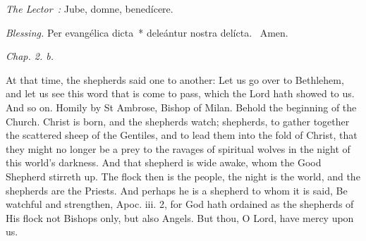 {  {
    \medskip

    \emph{The Lector~:} Jube, domne, benedícere.

    \emph{Blessing.} Per evangélica dicta~* deleántur nostra delícta. \Rbar{}~Amen.
  }

  \bigskip{}
  {


  }

  {
    \hspace{10ex}{Lesson VIII.}\hfill\emph{Chap. 2. b.}\hspace{10ex}

    \begin{parcolumns}[rulebetween,colwidths={1=.51\linewidth}]{2}
    {At that time, the shepherds said one to another: Let us go over to Bethlehem, and let us see this word that is come to pass, which the Lord hath showed to us. And so on.
Homily by St Ambrose, Bishop of Milan.
Behold the beginning of the Church. Christ is born, and the shepherds watch; shepherds, to gather together the scattered sheep of the Gentiles, and to lead them into the fold of Christ, that they might no longer be a prey to the ravages of spiritual wolves in the night of this world's darkness. And that shepherd is wide awake, whom the Good Shepherd stirreth up. The flock then is the people, the night is the world, and the shepherds are the Priests. And perhaps he is a shepherd to whom it is said, Be watchful and strengthen, Apoc. iii. 2, for God hath ordained as the shepherds of His flock not Bishops only, but also Angels.
      But thou, O Lord, have mercy upon us.}
    \end{parcolumns}

}}
